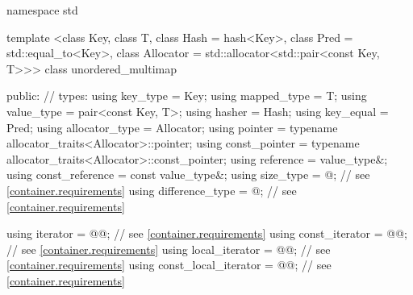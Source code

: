 %
\begin{codeblock}
namespace std {
  template <class Key,
            class T,
            class Hash = hash<Key>,
            class Pred = std::equal_to<Key>,
            class Allocator = std::allocator<std::pair<const Key, T>>>
  class unordered_multimap {
  public:
    // types:
    using key_type             = Key;
    using mapped_type          = T;
    using value_type           = pair<const Key, T>;
    using hasher               = Hash;
    using key_equal            = Pred;
    using allocator_type       = Allocator;
    using pointer              = typename allocator_traits<Allocator>::pointer;
    using const_pointer        = typename allocator_traits<Allocator>::const_pointer;
    using reference            = value_type&;
    using const_reference      = const value_type&;
    using size_type            = @\impdef@; // see \ref{container.requirements}
    using difference_type      = @\impdef@; // see \ref{container.requirements}

    using iterator             = @@; // see \ref{container.requirements}
    using const_iterator       = @@; // see \ref{container.requirements}
    using local_iterator       = @@; // see \ref{container.requirements}
    using const_local_iterator = @@; // see \ref{container.requirements}

}}
\end{codeblock}
